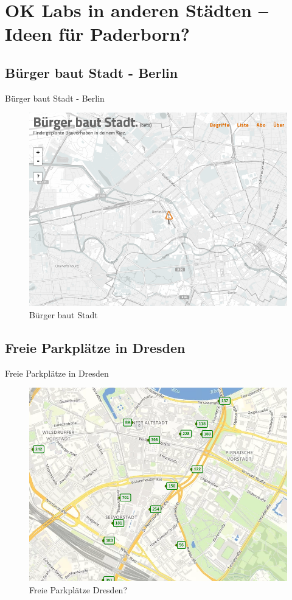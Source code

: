 \section{OK Labs in anderen Städten -- Ideen für Paderborn?}

\subsection{Bürger baut Stadt - Berlin}
\begin{frame}[t]{Bürger baut Stadt - Berlin}
\begin{figure}[h]
 \centering
 \includegraphics[scale=0.3]{section_other_ok_labs_constructions.png}
 \caption{Bürger baut Stadt \cite{Berlin}}
\end{figure}
\end{frame}


\subsection{Freie Parkplätze in Dresden}
\begin{frame}[t]{Freie Parkplätze in Dresden}
\begin{figure}[h]
 \centering
 \includegraphics[scale=0.3]{section_other_ok_labs_parking.png}
 \caption{Freie Parkplätze Dresden? \cite{Dresden}}
\end{figure}
\end{frame}

